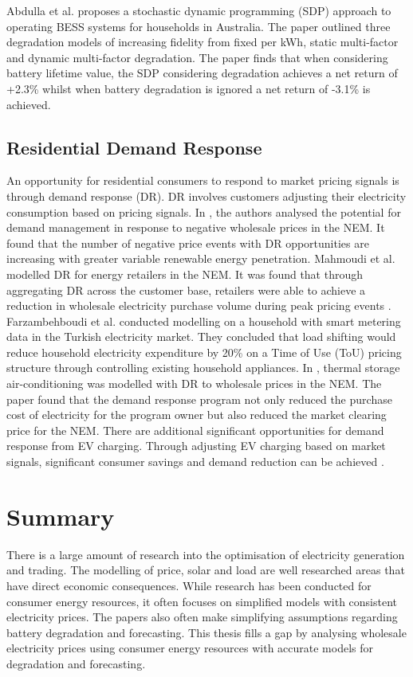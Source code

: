 Abdulla et al. \cite{abdulla2018optimal} proposes a stochastic dynamic programming (SDP) approach to operating BESS systems for households in Australia. The paper outlined three degradation models of increasing fidelity from fixed per kWh, static multi-factor and dynamic multi-factor degradation. The paper finds that when considering battery lifetime value, the SDP considering degradation achieves a net return of +2.3\% whilst when battery degradation is ignored a net return of -3.1\% is achieved. 

\label{sec:bg2.3}

\subsection{Residential Demand Response}
An opportunity for residential consumers to respond to market pricing signals is through demand response (DR). DR involves customers adjusting their electricity consumption based on pricing signals. In \cite{9715625}, the authors analysed the potential for demand management in response to negative wholesale prices in the NEM. It found that the number of negative price events with DR opportunities are increasing with greater variable renewable energy penetration. Mahmoudi et al. modelled DR for energy retailers in the NEM. It was found that through aggregating DR across the customer base, retailers were able to achieve a reduction in wholesale electricity purchase volume during peak pricing events \cite{Mahmoudi2013}. Farzambehboudi et al. \cite{Farzambehboudi2018} conducted modelling on a household with smart metering data in the Turkish electricity market. They concluded that load shifting would reduce household electricity expenditure by 20\% on a Time of Use (ToU) pricing structure through controlling existing household appliances. In \cite{5534825}, thermal storage air-conditioning was modelled with DR to wholesale prices in the NEM. The paper found that the demand response program not only reduced the purchase cost of electricity for the program owner but also reduced the market clearing price for the NEM. There are additional significant opportunities for demand response from EV charging. Through adjusting EV charging based on market signals, significant consumer savings and demand reduction can be achieved \cite{5661888}.

\section{Summary}
There is a large amount of research into the optimisation of electricity generation and trading. The modelling of price, solar and load are well researched areas that have direct economic consequences. While research has been conducted for consumer energy resources, it often focuses on simplified models with consistent electricity prices. The papers also often make simplifying assumptions regarding battery degradation and forecasting. This thesis fills a gap by analysing wholesale electricity prices using consumer energy resources with accurate models for degradation and forecasting. 
